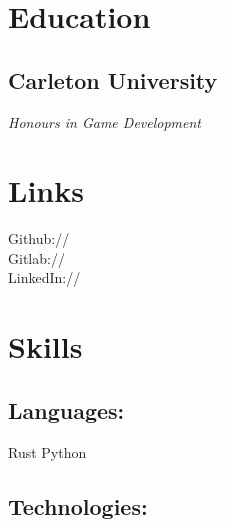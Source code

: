 \documentclass[]{deedy-resume-openfont}
\begin{document}
\vspace*{10pt}


%
%

\begin{minipage}[t]{0.33\textwidth}

\section{Education}

\subsection{Carleton University}
\textit{Honours in Game Development}
\sectionsep

\section{Links}

\sectionsep

Github:// \href{https://github.com/AngelOnFira}{}\\

Gitlab:// \href{https://gitlab.com/AngelOnFira}{}\\

LinkedIn://  \href{https://www.linkedin.com/in/forest-anderson}{}

\sectionsep

\section{Skills}

\subsection{Languages:}
\sectionsep

Rust \textbullet{} Python \\

\sectionsep
\subsection{Technologies:}
\sectionsep


\end{minipage}
\end{document}
